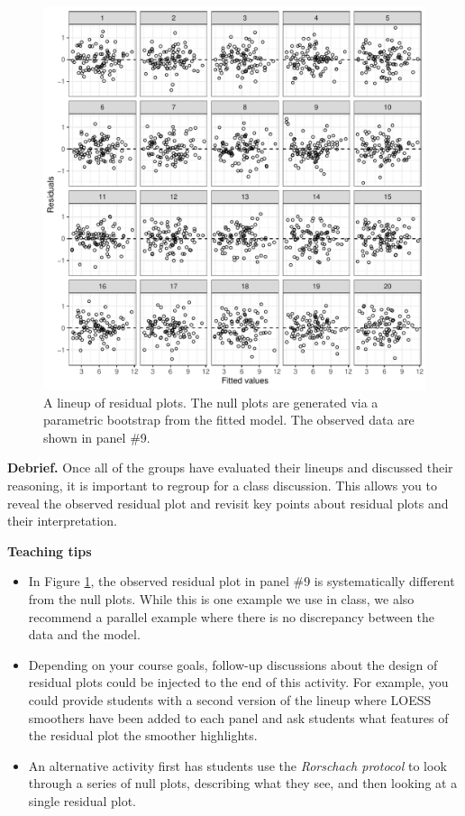 \documentclass[12pt]{article}
\begin{document}
\begin{figure}
\centering
\includegraphics{figs/residual_lineup.pdf}
\caption{\label{fig:lineupresid} A lineup of residual plots. The null
plots are generated via a parametric bootstrap from the fitted model.
The observed data are shown in panel \#9.}
\end{figure}

\textbf{Debrief.} Once all of the groups have evaluated their lineups
and discussed their reasoning, it is important to regroup for a class
discussion. This allows you to reveal the observed residual plot and
revisit key points about residual plots and their interpretation.

\textbf{Teaching tips}

\begin{itemize}
\item
  In Figure \ref{fig:lineupresid}, the observed residual plot in panel
  \#9 is systematically different from the null plots. While this is one
  example we use in class, we also recommend a parallel example where
  there is no discrepancy between the data and the model.
\item
  Depending on your course goals, follow-up discussions about the design
  of residual plots could be injected to the end of this activity. For
  example, you could provide students with a second version of the
  lineup where LOESS smoothers have been added to each panel and ask
  students what features of the residual plot the smoother highlights.
\item
  An alternative activity first has students use the
  \emph{Rorschach protocol} \citep{Buja-2009bd} to look through a series
  of null plots, describing what they see, and then looking at a single
  residual plot.
\end{itemize}
\end{document}
